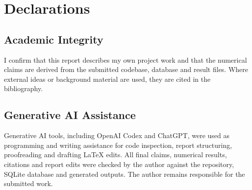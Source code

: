 \chapter*{Declarations}

\section*{Academic Integrity}

I confirm that this report describes my own project work and that the numerical claims are derived from the submitted codebase, database and result files. Where external ideas or background material are used, they are cited in the bibliography.

\section*{Generative AI Assistance}

Generative AI tools, including OpenAI Codex and ChatGPT, were used as programming and writing assistance for code inspection, report structuring, proofreading and drafting LaTeX edits. All final claims, numerical results, citations and report edits were checked by the author against the repository, SQLite database and generated outputs. The author remains responsible for the submitted work.
